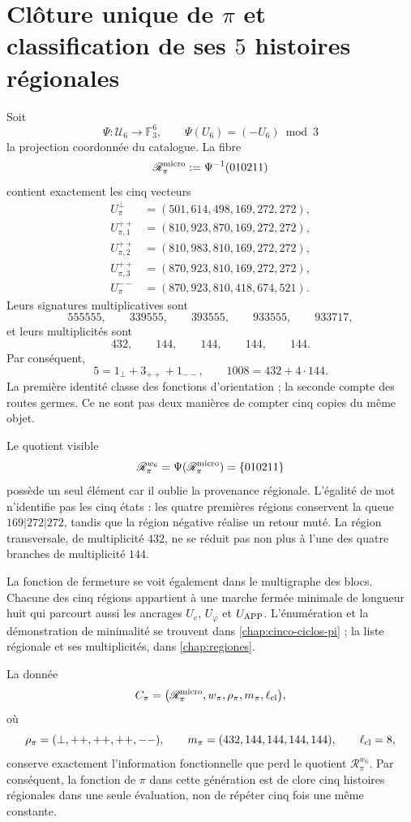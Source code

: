 \section{Clôture unique de \texorpdfstring{\(\pi\)}{pi} et classification de ses \(5\) histoires régionales}

Soit
\[
 \Psi:\mathcal U_6\longrightarrow\mathbb F_3^6,
 \qquad
 \Psi(U_6)=(-U_6)\bmod3
\]
la projection coordonnée du catalogue. La fibre
\[
 \mathscr R_\pi^{\rm micro}
 :=\Psi^{-1}(010211)
\]
contient exactement les cinq vecteurs
\[
\begin{aligned}
U_\pi^\perp&=(501,614,498,169,272,272),\\
U_{\pi,1}^{++}&=(810,923,870,169,272,272),\\
U_{\pi,2}^{++}&=(810,983,810,169,272,272),\\
U_{\pi,3}^{++}&=(870,923,810,169,272,272),\\
U_\pi^{--}&=(870,923,810,418,674,521).
\end{aligned}
\]
Leurs signatures multiplicatives sont
\[
555555,\qquad339555,\qquad393555,\qquad933555,\qquad933717,
\]
et leurs multiplicités sont
\[
432,\qquad144,\qquad144,\qquad144,\qquad144.
\]
Par conséquent,
\[
\boxed{
5=1_\perp+3_{++}+1_{--},
\qquad
1008=432+4\cdot144.}
\]
La première identité classe des fonctions d'orientation ; la seconde compte
des routes germes. Ce ne sont pas deux manières de compter cinq copies du même objet.

Le quotient visible
\[
 \mathscr R_\pi^{w_6}
 =\Psi(\mathscr R_\pi^{\rm micro})
 =\{010211\}
\]
possède un seul élément car il oublie la provenance régionale. L'égalité de
mot n'identifie pas les cinq états : les quatre premières régions
conservent la queue \(169|272|272\), tandis que la région négative réalise un
retour muté. La région transversale, de multiplicité \(432\), ne se
réduit pas non plus à l'une des quatre branches de multiplicité \(144\).

La fonction de fermeture se voit également dans le multigraphe des blocs. Chacune des
cinq régions appartient à une marche fermée minimale de longueur huit qui
parcourt aussi les ancrages \(U_e\), \(U_\varphi\) et \(U_{\rm APP}\).
L'énumération et la démonstration de minimalité se trouvent dans
\cref{chap:cinco-ciclos-pi} ; la liste régionale et ses multiplicités, dans
\cref{chap:regiones}.

\begin{proposition}
\label{prop:paquete-clausura-pi-rev6}
La donnée
\[
 \mathfrak C_\pi=
 \bigl(
 \mathscr R_\pi^{\rm micro},
 w_\pi,
 \rho_\pi,
 m_\pi,
 \ell_{\rm cl}
 \bigr),
\]
où
\[
\rho_\pi=(\perp,++ ,++ ,++ ,--),\qquad
m_\pi=(432,144,144,144,144),\qquad
\ell_{\rm cl}=8,
\]
conserve exactement l'information fonctionnelle que perd le quotient
\(\mathscr R_\pi^{w_6}\). Par conséquent, la fonction de \(\pi\) dans cette
génération est de clore cinq histoires régionales dans une seule évaluation,
non de répéter cinq fois une même constante.
\end{proposition}

